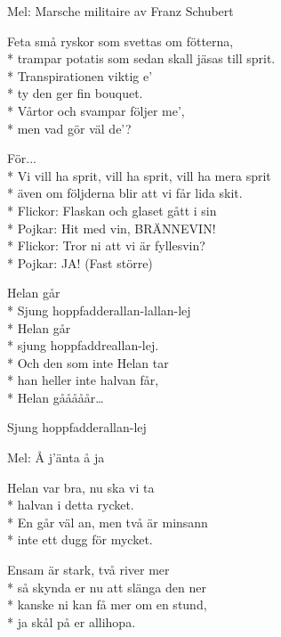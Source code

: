 \begin{SongText}
\begin{SongInfo}
    Mel: Marsche militaire av Franz Schubert
\end{SongInfo}
\begin{SongVerse}
    Feta små ryskor som svettas om fötterna,\\*%
    trampar potatis som sedan skall jäsas till sprit.\\*%
    Transpirationen viktig e’\\*%
    ty den ger fin bouquet.\\*%
    Vårtor och svampar följer me’,\\*%
    men vad gör väl de’?
\end{SongVerse}
\begin{SongVerse}
    För...\\*%
    Vi vill ha sprit, vill ha sprit, vill ha mera sprit\\*%
    även om följderna blir att vi får lida skit.\\*%
    Flickor: Flaskan och glaset gått i sin\\*%
    Pojkar: Hit med vin, BRÄNNEVIN!\\*%
    Flickor: Tror ni att vi är fyllesvin?\\*%
    Pojkar: JA! (Fast större)
\end{SongVerse}
\end{SongText}
\begin{SongText}
\begin{SongVerse}
    Helan går\\*%
    Sjung hoppfadderallan-lallan-lej\\*%
    Helan går\\*%
    sjung hoppfaddreallan-lej.\\*%
    Och den som inte Helan tar\\*%
    han heller inte halvan får,\\*%
    Helan gååååår…
\end{SongVerse}
\begin{SongVerse}
    Sjung hoppfadderallan-lej
\end{SongVerse}
\end{SongText}
\begin{SongText}
\begin{SongInfo}
    Mel: Å j’änta å ja
\end{SongInfo}
\begin{SongVerse}
    Helan var bra, nu ska vi ta\\*%
    halvan i detta rycket.\\*%
    En går väl an, men två är minsann\\*%
    inte ett dugg för mycket.
\end{SongVerse}
\begin{SongVerse}
    Ensam är stark, två river mer\\*%
    så skynda er nu att slänga den ner\\*%
    kanske ni kan få mer om en stund,\\*%
    ja skål på er allihopa.
\end{SongVerse}
\end{SongText}
